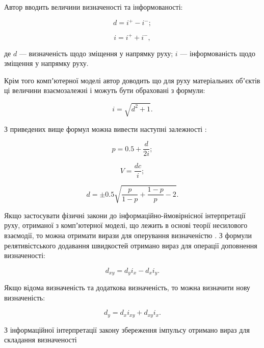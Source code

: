 Автор вводить величини визначеності та інформованості:

\begin{equation}
\label{eq:tnv3}
d=i^+ - i^-;
\end{equation}

\begin{equation}
\label{eq:tnv4}
i=i^+ + i^-,
\end{equation}

\noindent
де $d$ --- визначеність щодо зміщення у напрямку руху; $i$ --- інформованість щодо зміщення у напрямку руху.

Крім того компʼютерної моделі автор доводить що для руху матеріальних обʼєктів ці величини взаємозалежні і можуть бути обраховані з формули: 

\begin{equation}
\label{eq:tnv7}
i=\sqrt{d^2+1}.
\end{equation}

З приведених вище формул можна вивести наступні залежності \cite{Teslia_2010}:

\begin{equation}
\label{eq:tnv5}
p=0.5+\frac{d}{2i};
\end{equation}

\begin{equation}
\label{eq:tnv6}
V=\frac{dc}{i};
\end{equation}

\begin{equation}
\label{eq:tnv8}
d=\pm0.5\sqrt{\frac{p}{1-p}+\frac{1-p}{p}-2}.
\end{equation}

Якщо застосувати фізичні закони до інформаційно-ймовірнісної інтерпретації руху, отриманої з компʼютерної моделі, що лежить в основі теорії несилового взаємодії, то можна отримати вирази для оперування визначеністю \cite{Teslia_2010_2}. З формули релятивістського додавання швидкостей отримано вираз для операції доповнення визначеності:

\begin{equation}
\label{eq:tnv9}
d_{xy}=d_yi_x-d_xi_y.
\end{equation}

Якщо відома визначеність та додаткова визначеність, то можна визначити нову визначеність:

\begin{equation}
\label{eq:tnv10}
d_y=d_xi_{xy}+d_{xy}i_x.
\end{equation}

З інформаційної інтерпретації закону збереження імпульсу отримано вираз для складання визначеності

